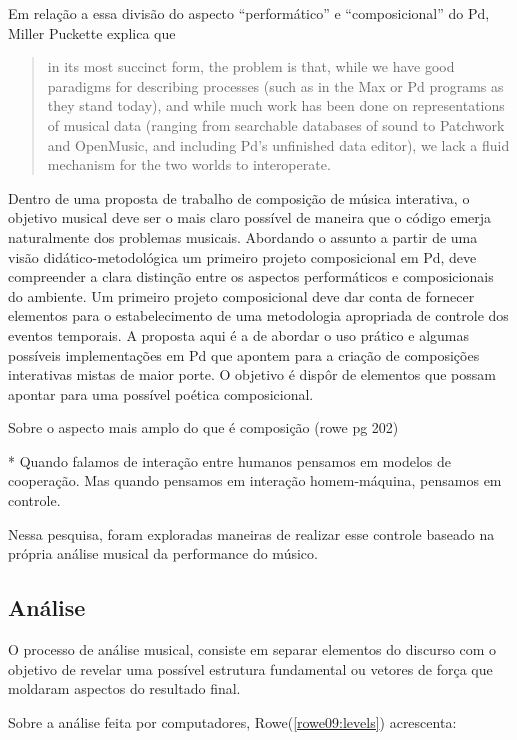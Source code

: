 \documentclass{ppgmus}
\begin{document}
Em relação a essa divisão do aspecto ``performático'' e
``composicional'' do Pd, Miller Puckette explica que

\begin{quote}
  in its most succinct form, the problem is that, while we have good
  paradigms for describing processes (such as in the Max or Pd
  programs as they stand today), and while much work has been done on
  representations of musical data (ranging from searchable databases
  of sound to Patchwork and OpenMusic, and including Pd's unfinished
  data editor), we lack a fluid mechanism for the two worlds to
  interoperate. \cite{puckette04:divide}
\end{quote}

Dentro de uma proposta de trabalho de composição de música interativa,
o objetivo musical deve ser o mais claro possível de maneira que o
código emerja naturalmente dos problemas musicais. Abordando o assunto
a partir de uma visão didático-metodológica um primeiro projeto
composicional em Pd, deve compreender a clara distinção entre os
aspectos performáticos e composicionais do ambiente. Um primeiro
projeto composicional deve dar conta de fornecer elementos para o
estabelecimento de uma metodologia apropriada de controle dos eventos
temporais. A proposta aqui é a de abordar o uso prático e algumas
possíveis implementações em Pd que apontem para a criação de
composições interativas mistas de maior porte. O objetivo é dispôr de
elementos que possam apontar para uma possível poética composicional.

Sobre o aspecto mais amplo do que é composição (rowe pg 202)
 

* Quando falamos de interação entre humanos pensamos em modelos
de cooperação. Mas quando pensamos em interação homem-máquina, 
pensamos em controle. 

Nessa pesquisa, foram exploradas maneiras de
realizar esse controle baseado na própria análise musical da
performance do músico.


\subsection{Análise}


O processo de análise musical, consiste em separar elementos
do discurso com o objetivo de revelar uma possível estrutura fundamental
ou vetores de força que moldaram aspectos do resultado final.

Sobre a análise feita por computadores, Rowe(\ref{rowe09:levels})
acrescenta:
\end{document}
